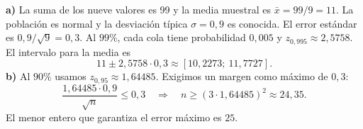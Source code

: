 \textbf{a)} La suma de los nueve valores es 99 y la media muestral es $\bar x=99/9=11$. La población es normal y la desviación típica $\sigma=0{,}9$ es conocida. El error estándar es $0{,}9/\sqrt9=0{,}3$. Al $99\%$, cada cola tiene probabilidad $0{,}005$ y $z_{0{,}995}\approx2{,}5758$. El intervalo para la media es
\[
 11\pm2{,}5758\cdot0{,}3
 \approx\boxed{[10{,}2273;\ 11{,}7727]}.
\]
\textbf{b)} Al $90\%$ usamos $z_{0{,}95}\approx1{,}64485$. Exigimos un margen como máximo de $0{,}3$:
\[
 \frac{1{,}64485\cdot0{,}9}{\sqrt n}\le0{,}3
 \quad\Longrightarrow\quad n\ge(3\cdot1{,}64485)^2\approx24{,}35.
\]
El menor entero que garantiza el error máximo es $\boxed{25}$.
